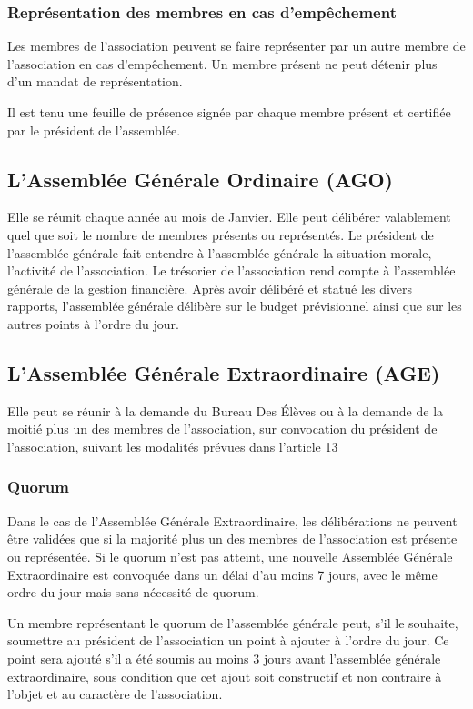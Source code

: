 \documentclass{article} %
\begin{document}
			\subsubsection{Représentation des membres en cas d’empêchement}
				Les membres de l’association peuvent se faire représenter par un autre membre de l’association en cas d’empêchement.
				Un membre présent ne peut détenir plus d’un mandat de représentation.

				Il est tenu une feuille de présence signée par chaque membre présent et certifiée par le président de l’assemblée.

		\subsection{L’Assemblée Générale Ordinaire (AGO)}
			Elle se réunit chaque année au mois de Janvier. Elle peut délibérer valablement quel que soit le nombre de membres présents ou représentés.
			Le président de l’assemblée générale fait entendre à l’assemblée générale la situation morale, l’activité de l’association.
			Le trésorier de l’association rend compte à l’assemblée générale de la gestion financière. Après avoir délibéré et statué les divers rapports,
			l’assemblée générale délibère sur le budget prévisionnel ainsi que sur les autres points à l’ordre du jour. 

		\subsection{L’Assemblée Générale Extraordinaire (AGE)}
			Elle peut se réunir à la demande du Bureau Des Élèves ou à la demande de la moitié plus un des membres de l’association,
			sur convocation du président de l’association, suivant les modalités prévues dans l’article 13

			\subsubsection{Quorum}
				Dans le cas de l’Assemblée Générale Extraordinaire, les délibérations ne peuvent être validées que si la majorité plus un
				des membres de l’association est présente ou représentée. Si le quorum n’est pas atteint, une nouvelle Assemblée Générale Extraordinaire
				est convoquée dans un délai d’au moins 7 jours, avec le même ordre du jour mais sans nécessité de quorum.

				Un membre représentant le quorum de l’assemblée générale peut, s’il le souhaite, soumettre au président de l’association un point à ajouter
				à l’ordre du jour. Ce point sera ajouté s’il a été soumis au moins 3 jours avant l’assemblée générale extraordinaire, sous condition que cet
				ajout soit constructif et non contraire à l'objet et au caractère de l’association.
\end{document}
